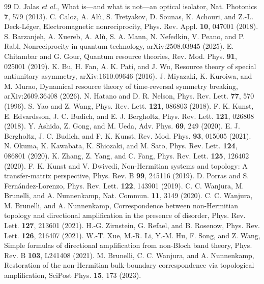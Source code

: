 \documentclass[aps,pra,twocolumn,superscriptaddress,floatfix,nofootinbib]{revtex4-2}
\theoremstyle{definition}
\begin{document}
\begin{thebibliography}{99}
 D. Jalas \emph{et al.}, What is---and what is not---an optical isolator, Nat. Photonics \textbf{7}, 579 (2013).
 C. Caloz, A. Al\`u, S. Tretyakov, D. Sounas, K. Achouri, and Z.-L. Deck-L\'eger, Electromagnetic nonreciprocity, Phys. Rev. Appl. \textbf{10}, 047001 (2018).
 S. Barzanjeh, A. Xuereb, A. Al\`u, S. A. Mann, N. Nefedkin, V. Peano, and P. Rabl, Nonreciprocity in quantum technology, arXiv:2508.03945 (2025).
 E. Chitambar and G. Gour, Quantum resource theories, Rev. Mod. Phys. \textbf{91}, 025001 (2019).
 K. Bu, H. Fan, A. K. Pati, and J. Wu, Resource theory of special antiunitary asymmetry, arXiv:1610.09646 (2016).
 J. Miyazaki, K. Kuroiwa, and M. Murao, Dynamical resource theory of time-reversal symmetry breaking, arXiv:2609.36408 (2026).
 N. Hatano and D. R. Nelson, Phys. Rev. Lett. \textbf{77}, 570 (1996).
 S. Yao and Z. Wang, Phys. Rev. Lett. \textbf{121}, 086803 (2018).
 F. K. Kunst, E. Edvardsson, J. C. Budich, and E. J. Bergholtz, Phys. Rev. Lett. \textbf{121}, 026808 (2018).
 Y. Ashida, Z. Gong, and M. Ueda, Adv. Phys. \textbf{69}, 249 (2020).
 E. J. Bergholtz, J. C. Budich, and F. K. Kunst, Rev. Mod. Phys. \textbf{93}, 015005 (2021).
 N. Okuma, K. Kawabata, K. Shiozaki, and M. Sato, Phys. Rev. Lett. \textbf{124}, 086801 (2020).
 K. Zhang, Z. Yang, and C. Fang, Phys. Rev. Lett. \textbf{125}, 126402 (2020).
 F. K. Kunst and V. Dwivedi, Non-Hermitian systems and topology: A transfer-matrix perspective, Phys. Rev. B \textbf{99}, 245116 (2019).
 D. Porras and S. Fern\'andez-Lorenzo, Phys. Rev. Lett. \textbf{122}, 143901 (2019).
 C. C. Wanjura, M. Brunelli, and A. Nunnenkamp, Nat. Commun. \textbf{11}, 3149 (2020).
 C. C. Wanjura, M. Brunelli, and A. Nunnenkamp, Correspondence between non-Hermitian topology and directional amplification in the presence of disorder, Phys. Rev. Lett. \textbf{127}, 213601 (2021).
 H.-G. Zirnstein, G. Refael, and B. Rosenow, Phys. Rev. Lett. \textbf{126}, 216407 (2021).
 W.-T. Xue, M.-R. Li, Y.-M. Hu, F. Song, and Z. Wang, Simple formulas of directional amplification from non-Bloch band theory, Phys. Rev. B \textbf{103}, L241408 (2021).
 M. Brunelli, C. C. Wanjura, and A. Nunnenkamp, Restoration of the non-Hermitian bulk-boundary correspondence via topological amplification, SciPost Phys. \textbf{15}, 173 (2023).

\end{thebibliography}
\end{document}
